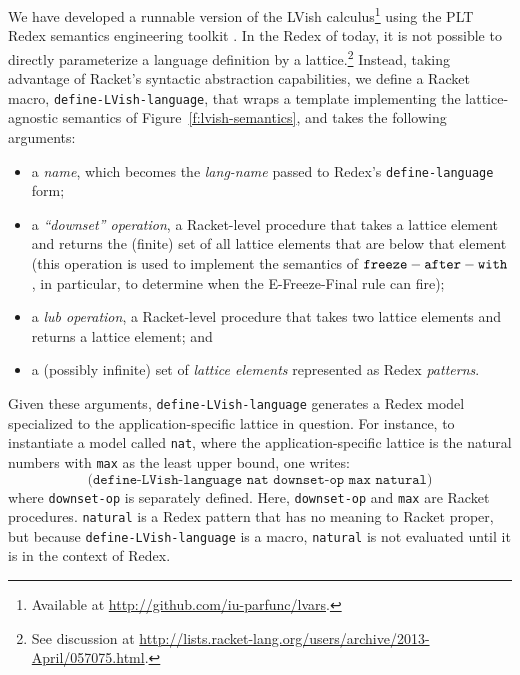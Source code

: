 We have developed a runnable version of the LVish
calculus\footnote{Available at
  \url{http://github.com/iu-parfunc/lvars}.} using the PLT Redex
semantics engineering toolkit \cite{redex-book}.  In the Redex of
today, it is not possible to directly parameterize a language
definition by a lattice.\footnote{See discussion at
  \url{http://lists.racket-lang.org/users/archive/2013-April/057075.html}.}
Instead, taking advantage of Racket's syntactic abstraction
capabilities, we define a Racket macro,
\texttt{define-LVish-language}, that wraps a template implementing the
lattice-agnostic semantics of Figure~\ref{f:lvish-semantics}, and
takes the following arguments:
\begin{itemize}
\item a \emph{name}, which becomes the \emph{lang-name} passed to
  Redex's \texttt{define-language} form;
\item a \emph{``downset'' operation}, a Racket-level procedure that
  takes a lattice element and returns the (finite) set of all lattice
  elements that are below that element (this operation is used to
  implement the semantics of ${\mbox{\texttt{freeze}}-\mbox{\texttt{after}}-\mbox{\texttt{with}}}$, in particular, to determine when
  the {\sc E-Freeze-Final} rule can fire);
\item a \emph{lub operation}, a Racket-level procedure that takes two
  lattice elements and returns a lattice element; and
\item a (possibly infinite) set of \emph{lattice elements} represented
  as Redex \emph{patterns}.
\end{itemize}
Given these arguments, \texttt{define-LVish-language} generates a
Redex model specialized to the application-specific lattice in
question. For instance, to instantiate a model called \texttt{nat},
where the application-specific lattice is the natural numbers with
\texttt{max} as the least upper bound, one writes:
\[
\texttt{(define-LVish-language nat downset-op max natural)}
\]
where \texttt{downset-op} is separately defined.  Here,
\texttt{downset-op} and \texttt{max} are Racket procedures.
\texttt{natural} is a Redex pattern that has no meaning to Racket
proper, but because \texttt{define-LVish-language} is a macro,
\texttt{natural} is not evaluated until it is in the context of
Redex.
